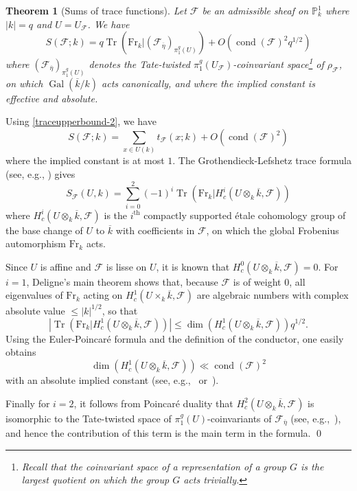 \documentclass[12pt,a4paper,reqno]{amsart}
\numberwithin{equation}{section}
\DeclareMathOperator*\cond{cond}
\DeclareMathOperator*\Gal{Gal}
\theoremstyle{plain}
\newtheorem{theorem}{Theorem}[section]
\theoremstyle{definition}
\newcommand\F{\mathbb{F}}
\newcommand\Fr{\mathrm{Fr}}
\newcommand\tr{\mathrm{tr}}
\newcommand\ov{\overline}
\newcommand\mcF{\mathcal{F}}
\newcommand\Pl{\mathbb{P}^1}
\DeclareMathOperator{\Tr}{Tr}
\newcommand\Fp{\F_{p}}
\begin{document}
\begin{theorem}[Sums of trace functions]\label{propGL1}
  Let $\mcF$ be an admissible sheaf on $\Pl_k$ where $|k|=q$ and
  $U=U_{\mcF}$. We have
$$
S(\mcF;k)=q\Tr\left(\Fr_{k}|(\mcF_{\ov\eta})_{\pi_1^g(U)}\right)
+O(\cond(\mcF)^2q^{1/2})
$$ 
where $(\mcF_{\ov\eta})_{\pi_1^g(U)}$ denotes the Tate-twisted
$\pi_1^g(U_{\mcF})$-coinvariant space\footnote{Recall that the
  coinvariant space of a representation of a group $G$ is the largest
  quotient on which the group $G$ acts trivially.} of $\rho_{\mcF}$,
on which $\Gal(\ov k/k)$ acts canonically, and where the implied
constant is effective and absolute.
\end{theorem}

\proof Using \eqref{traceupperbound-2}, we have
$$
S(\mcF;k)=\sum_{x\in U(k)}t_\mcF(x;k)+O(\cond(\mcF)^2)
$$
where the implied constant is at most $1$. The Grothendieck-Lefshetz
trace formula (see, e.g., \cite[Chap.\ 3]{GKM}) gives
$$
S_\mcF(U,k)=\sum_{i=0}^2(-1)^i\Tr\left(\Fr_{k}|H_c^i(U\otimes_k\ov
  k,\mcF)\right)
$$
where $H^i_c(U\otimes_k\ov{k},\mcF)$ is the $i^{\operatorname{th}}$ compactly supported
\'etale cohomology group of the base change of $U$ to $\ov{k}$ with
coefficients in $\mcF$, on which the global Frobenius automorphism
$\Fr_k$ acts.
\par
Since $U$ is affine and $\mcF$ is lisse on $U$, it is known that
$H_c^0(U\otimes_k\ov k,\mcF)=0$. For $i=1$, Deligne's main theorem
shows that, because $\mcF$ is of weight $0$, all eigenvalues of
$\Fr_k$ acting on $H^1_c(U\times_k\ov{k},\mcF)$ are algebraic numbers
with complex absolute value $\leq |k|^{1/2}$, so that
$$
\left|\Tr\left(\Fr_{k}|H_c^1(U\otimes_k\ov k,\mcF)\right)\right| \leq
\dim\left(H_c^1(U\otimes_k\ov k,\mcF)\right)q^{1/2}.
$$
Using the Euler-Poincar\'e formula and the definition of the
conductor, one easily obtains
$$
\dim\left(H_c^1(U\otimes_k\ov k,\mcF)\right)\ll \cond(\mcF)^2
$$
with an absolute implied constant (see, e.g.,~\cite[Chap.\ 2]{GKM}
or~\cite[Th. 2.4]{FKMGowersnorms}).
\par
Finally for $i=2$, it follows from Poincar\'e duality that
$H_c^2(U\otimes_k\ov k,\mcF)$ is isomorphic to the Tate-twisted space of
$\pi_1^g(U)$-coinvariants of $\mcF_{\ov \eta}$ (see,
e.g.,~\cite[Chap. 2.]{GKM}), and hence the contribution of
this term is the main term in the formula.
\qed
\end{document}
